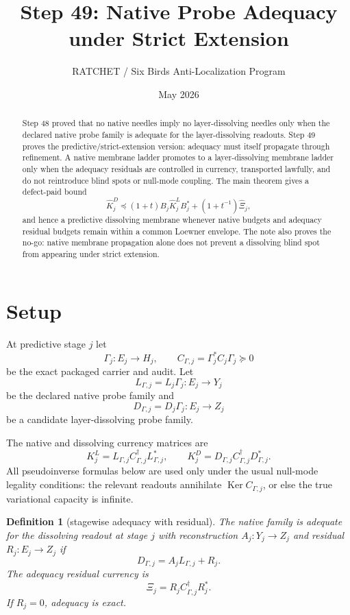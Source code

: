 \documentclass[11pt]{article}
\title{Step 49: Native Probe Adequacy under Strict Extension}
\author{RATCHET / Six Birds Anti-Localization Program}
\date{May 2026}
\newtheorem{definition}[theorem]{Definition}
\newcommand{\Ker}{\operatorname{Ker}}
\begin{document}
\maketitle

\begin{abstract}
Step 48 proved that no native needles imply no layer-dissolving needles only when the declared native probe family is adequate for the layer-dissolving readouts. Step 49 proves the predictive/strict-extension version: adequacy must itself propagate through refinement. A native membrane ladder promotes to a layer-dissolving membrane ladder only when the adequacy residuals are controlled in currency, transported lawfully, and do not reintroduce blind spots or null-mode coupling. The main theorem gives a defect-paid bound
\[
  \widehat K^D_j \preceq (1+t)B_j\widehat K^L_jB_j^*+(1+t^{-1})\widehat\Xi_j,
\]
and hence a predictive dissolving membrane whenever native budgets and adequacy residual budgets remain within a common Loewner envelope. The note also proves the no-go: native membrane propagation alone does not prevent a dissolving blind spot from appearing under strict extension.
\end{abstract}

\section{Setup}

At predictive stage $j$ let
\[
  \Gamma_j:E_j\to H_j,
  \qquad
  C_{\Gamma,j}=\Gamma_j^*C_j\Gamma_j\succeq0
\]
be the exact packaged carrier and audit. Let
\[
  L_{\Gamma,j}=L_j\Gamma_j:E_j\to Y_j
\]
be the declared native probe family and
\[
  D_{\Gamma,j}=D_j\Gamma_j:E_j\to Z_j
\]
be a candidate layer-dissolving probe family.

The native and dissolving currency matrices are
\[
  K^L_j=L_{\Gamma,j}C_{\Gamma,j}^{\dagger}L_{\Gamma,j}^*,
  \qquad
  K^D_j=D_{\Gamma,j}C_{\Gamma,j}^{\dagger}D_{\Gamma,j}^*.
\]
All pseudoinverse formulas below are used only under the usual null-mode legality conditions: the relevant readouts annihilate $\Ker C_{\Gamma,j}$, or else the true variational capacity is infinite.

\begin{definition}[stagewise adequacy with residual]
The native family is adequate for the dissolving readout at stage $j$ with reconstruction $A_j:Y_j\to Z_j$ and residual $R_j:E_j\to Z_j$ if
\[
  D_{\Gamma,j}=A_jL_{\Gamma,j}+R_j.
\]
The adequacy residual currency is
\[
  \Xi_j=R_jC_{\Gamma,j}^{\dagger}R_j^*.
\]
If $R_j=0$, adequacy is exact.
\end{definition}
\end{document}
